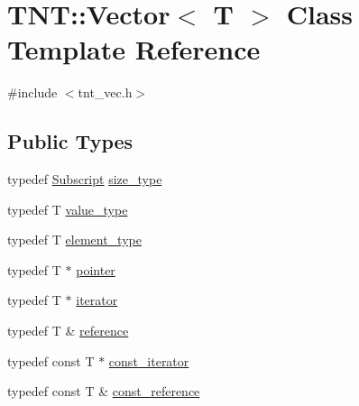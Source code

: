 \hypertarget{classTNT_1_1Vector}{\section{T\-N\-T\-:\-:Vector$<$ T $>$ Class Template Reference}
\label{classTNT_1_1Vector}
}


{\ttfamily \#include $<$tnt\-\_\-vec.\-h$>$}

\subsection*{Public Types}
\begin{DoxyCompactItemize}
\item 
typedef \hyperlink{namespaceTNT_af22e3f1460e145c04ce4e7d701e4c1c1}{Subscript} \hyperlink{classTNT_1_1Vector_adf52e96536358fcc4507fd08402aa07f}{size\-\_\-type}
\item 
typedef T \hyperlink{classTNT_1_1Vector_a329d23fe25894a94d461353dd9c7c1be}{value\-\_\-type}
\item 
typedef T \hyperlink{classTNT_1_1Vector_af87934ec2406d242f6cc98035686bd1f}{element\-\_\-type}
\item 
typedef T $\ast$ \hyperlink{classTNT_1_1Vector_aacdf3935ca58837be7e80d21d8e17c6d}{pointer}
\item 
typedef T $\ast$ \hyperlink{classTNT_1_1Vector_a7289b2334c4c28181bb4193fa32fc48a}{iterator}
\item 
typedef T \& \hyperlink{classTNT_1_1Vector_a9cdf62749080406bdf3fbace264dac85}{reference}
\item 
typedef const T $\ast$ \hyperlink{classTNT_1_1Vector_a9a825ae9b3cb568a7b02449da6e9779f}{const\-\_\-iterator}
\item 
typedef const T \& \hyperlink{classTNT_1_1Vector_a2957faed9560f1f53bc5943a160d71bf}{const\-\_\-reference}
\end{DoxyCompactItemize}
